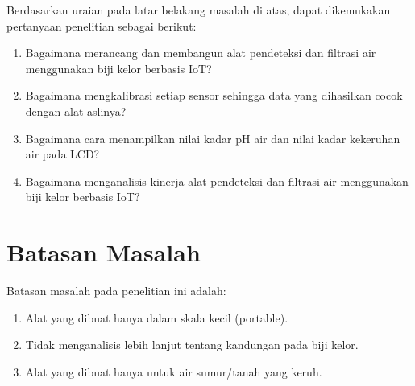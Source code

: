 Berdasarkan uraian pada latar belakang masalah di atas, dapat dikemukakan pertanyaan penelitian sebagai berikut:

\begin{enumerate}[topsep=0pt,itemsep=0pt,partopsep=0pt, parsep=0pt]
    \item Bagaimana merancang dan membangun alat pendeteksi dan filtrasi air menggunakan biji kelor berbasis IoT?
    \item Bagaimana mengkalibrasi setiap sensor sehingga data yang dihasilkan cocok dengan alat aslinya?
    \item Bagaimana cara menampilkan nilai kadar pH air dan nilai kadar kekeruhan air pada LCD?
    \item Bagaimana menganalisis kinerja alat pendeteksi dan filtrasi air menggunakan biji kelor berbasis IoT?
\end{enumerate}

\section{Batasan Masalah}

Batasan masalah pada penelitian ini adalah:

\begin{enumerate}[topsep=0pt,itemsep=0pt,partopsep=0pt, parsep=0pt]
    \item Alat yang dibuat hanya dalam skala kecil (portable).
    \item Tidak menganalisis lebih lanjut tentang kandungan pada biji kelor.
    \item Alat yang dibuat hanya untuk air sumur/tanah yang keruh.
\end{enumerate}